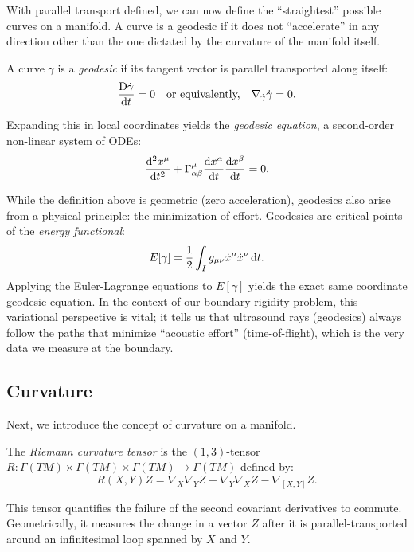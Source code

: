 With parallel transport defined, we can now define the ``straightest'' possible curves on a manifold. A curve is a geodesic if it does not ``accelerate'' in any direction other than the one dictated by the curvature of the manifold itself.

\begin{definition}
  A curve $\gamma$ is a \emph{geodesic} if its tangent vector is parallel transported along itself:
  \[%
    \codv{\dot{\gamma}}{t} = 0 \quad \text{or equivalently,} \quad \nabla_{\dot{\gamma}} \dot{\gamma} = 0
  .\]%
\end{definition}

Expanding this in local coordinates yields the \emph{geodesic equation}, a second-order non-linear system of ODEs:
\[%
  \odv[2]{x^\mu}{t} + \Gamma^\mu_{\alpha\beta} \odv{x^\alpha}{t} \odv{x^\beta}{t} = 0
.\]%

While the definition above is geometric (zero acceleration), geodesics also arise from a physical principle: the minimization of effort. Geodesics are critical points of the \emph{energy functional}:
\[%
  E[\gamma] = \frac{1}{2} \int_I g_{\mu\nu} \dot{x}^\mu \dot{x}^\nu \dt
.\]%
Applying the Euler-Lagrange equations to $E[\gamma]$ yields the exact same coordinate geodesic equation. In the context of our boundary rigidity problem, this variational perspective is vital; it tells us that ultrasound rays (geodesics) always follow the paths that minimize ``acoustic effort'' (time-of-flight), which is the very data we measure at the boundary.

\subsection{Curvature} Next, we introduce the concept of curvature on a manifold.

\begin{definition}
  The \emph{Riemann curvature tensor} is the $(1,3)$-tensor $R: \Gamma(TM) \times \Gamma(TM) \times \Gamma(TM) \to \Gamma(TM)$ defined by:
  \begin{equation}
    R(X,Y)Z = \nabla_X \nabla_Y Z - \nabla_Y \nabla_X Z - \nabla_{[X,Y]} Z
  .\end{equation}
\end{definition}

This tensor quantifies the failure of the second covariant derivatives to commute. Geometrically, it measures the change in a vector $Z$ after it is parallel-transported around an infinitesimal loop spanned by $X$ and $Y$.

